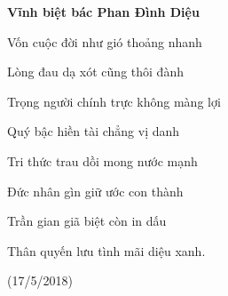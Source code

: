 \textbf{Vĩnh biệt bác Phan Đình Diệu }

Vốn cuộc đời như gió thoảng nhanh

Lòng đau dạ xót cũng thôi đành

Trọng người chính trực không màng lợi

Quý bậc hiền tài chẳng vị danh

Tri thức trau dồi mong nước mạnh

Đức nhân gìn giữ ước con thành

Trần gian giã biệt còn in dấu

Thân quyến lưu tình mãi diệu xanh.

(17/5/2018)